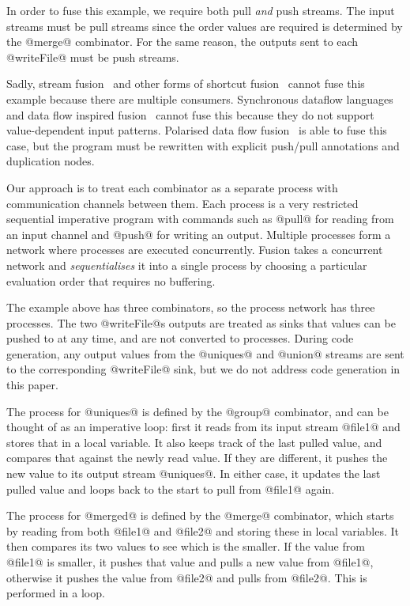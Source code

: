 In order to fuse this example, we require both pull \emph{and} push streams.
The input streams must be pull streams since the order values are required is determined by the @merge@ combinator.
For the same reason, the outputs sent to each @writeFile@ must be push streams.


Sadly, stream fusion~\cite{coutts2007stream} and other forms of shortcut fusion~\cite{jones2001playing} cannot fuse this example because there are multiple consumers.
Synchronous dataflow languages~\cite{mandel2010lucy} and data flow inspired fusion~\cite{lippmeier2013data} cannot fuse this because they do not support value-dependent input patterns.
Polarised data flow fusion~\cite{lippmeier2016polarized} is able to fuse this case, but the program must be rewritten with explicit push/pull annotations and duplication nodes.

Our approach is to treat each combinator as a separate process with communication channels between them.
Each process is a very restricted sequential imperative program with commands such as @pull@ for reading from an input channel and @push@ for writing an output.
Multiple processes form a network where processes are executed concurrently.
Fusion takes a concurrent network and \emph{sequentialises} it into a single process by choosing a particular evaluation order that requires no buffering.

The example above has three combinators, so the process network has three processes.
The two @writeFile@s outputs are treated as sinks that values can be pushed to at any time, and are not converted to processes.
During code generation, any output values from the @uniques@ and @union@ streams are sent to the corresponding @writeFile@ sink, but we do not address code generation in this paper.

The process for @uniques@ is defined by the @group@ combinator, and can be thought of as an imperative loop: first it reads from its input stream @file1@ and stores that in a local variable.
It also keeps track of the last pulled value, and compares that against the newly read value.
If they are different, it pushes the new value to its output stream @uniques@.
In either case, it updates the last pulled value and loops back to the start to pull from @file1@ again.

The process for @merged@ is defined by the @merge@ combinator, which starts by reading from both @file1@ and @file2@ and storing these in local variables.
It then compares its two values to see which is the smaller.
If the value from @file1@ is smaller, it pushes that value and pulls a new value from @file1@, otherwise it pushes the value from @file2@ and pulls from @file2@.
This is performed in a loop.

